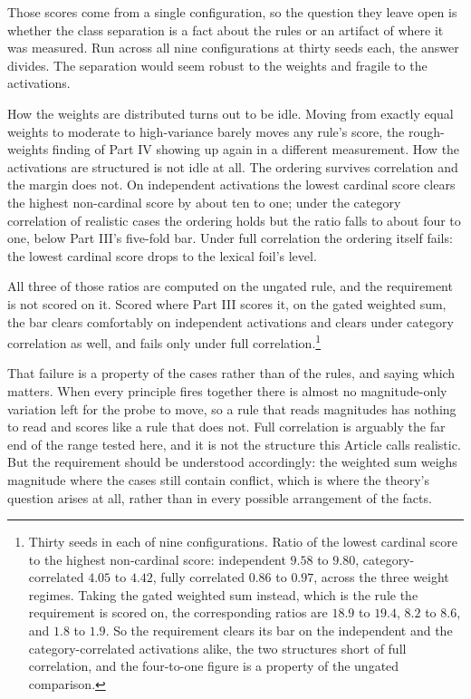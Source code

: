 Those scores come from a single configuration, so the question they leave
open is whether the class separation is a fact about the rules or an
artifact of where it was measured. Run across all nine configurations at
thirty seeds each, the answer divides. The separation would seem robust to the weights and fragile to the
activations.

How the weights are distributed turns out to be idle. Moving from exactly
equal weights to moderate to high-variance barely moves any rule's score,
the rough-weights finding of Part IV showing up again in a
different measurement. How the activations are structured is not idle at
all. The ordering survives correlation and the margin does not. On independent
activations the lowest cardinal score clears the highest non-cardinal score by
about ten to one; under the category correlation of realistic cases the
ordering holds but the ratio falls to about four to one, below Part III's
five-fold bar. Under full correlation the ordering itself fails: the lowest
cardinal score drops to the lexical foil's level.

All three of those ratios are computed on the ungated rule, and the
requirement is not scored on it. Scored where Part III scores it, on the gated weighted
sum, the bar clears comfortably on independent activations and clears under
category correlation as well, and fails only under full
correlation.\footnote{Thirty seeds in each of nine configurations. Ratio of
the lowest cardinal score to the highest non-cardinal score: independent
$9.58$ to $9.80$, category-correlated $4.05$ to $4.42$, fully correlated
$0.86$ to $0.97$, across the three weight regimes. Taking the gated weighted
sum instead, which is the rule the requirement is scored on, the corresponding
ratios are $18.9$ to $19.4$, $8.2$ to $8.6$, and $1.8$ to $1.9$. So the
requirement clears its bar on the independent and the category-correlated
activations alike, the two structures short of full correlation, and the
four-to-one figure is a property of the ungated comparison.}

That failure is a property of the cases rather than of the rules, and
saying which matters. When every principle fires together there is almost
no magnitude-only variation left for the probe to move, so a rule that
reads magnitudes has nothing to read and scores like a rule that does not.
Full correlation is arguably the far end of the range tested here, and it
is not the structure this Article calls realistic. But the requirement should be
understood accordingly: the weighted sum weighs magnitude where the cases
still contain conflict, which is where the theory's question arises at all,
rather than in every possible arrangement of the facts.

